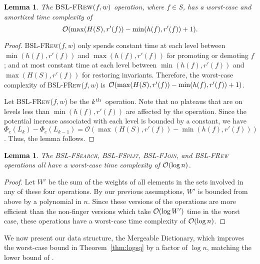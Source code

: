 \documentclass[11pt]{article}
\newcommand{\ens}[1]{\ensuremath{#1}}
\newcommand{\kth}{\ens{k^{ \mbox{\hspace{.2mm}\scriptsize th}}}}
\newcommand{\Ds}{Mergeable Dictionary}
\newcommand{\Bslfsrc}{\mbox{\textsc{BSL-FSearch}}}
\newcommand{\Bslfspl}{\mbox{\textsc{BSL-FSplit}}}
\newcommand{\Bslfjoin}{\mbox{\textsc{BSL-FJoin}}}
\newcommand{\Bslfrew}{\mbox{\textsc{BSL-FRew}}}
\newcommand{\Bslfrewx}[2]{\mbox{\textsc{BSL-FRew(\ensuremath{#1,#2})}}}
\newcommand{\nodeheight}[1]{\ensuremath{h(#1)}}
\newcommand{\intheight}[1]{\ensuremath{H(#1)}}
\newcommand{\nodenewrank}[1]{\ensuremath{r'(\node #1)}}
\newcommand{\node}[1]{\ensuremath{#1}}
\newcommand{\indatast}[1]{\ensuremath{L_{#1}}}
\newcommand{\locpotfun}[1]{\ensuremath{\Phi_{e}(#1)}}
\newcounter{count}
\newtheorem{lemma}[count]{Lemma}
\begin{document}
\begin{lemma} 
\label{lem:costofbslfreweight} 
The $\Bslfrewx{f}{w}$ operation, where $f\in S$, has a worst-case and amortized time complexity of 
\[{\cal O}(\max(\intheight{S},\nodenewrank f) - \min(\nodeheight f, \nodenewrank f)+1).\] 
\end{lemma} 


\begin{proof} 
\Bslfrewx{f}{w} only spends constant time at each level between $\min(\nodeheight f, \nodenewrank f)$ and $\max(\nodeheight f, \nodenewrank f)$ for promoting or demoting \node f; and at most constant time at each level between $\min(\nodeheight f, \nodenewrank f)$ and $\max(\intheight{S},\nodenewrank f)$ for restoring invariants. Therefore, the worst-case complexity of \Bslfrewx{f}{w} is ${\cal O}(\max(\intheight{S},\nodenewrank f) - \min(\nodeheight f, \nodenewrank f)+1)$. 

Let \Bslfrewx{f}{w} be the \kth\ operation. Note that no plateaus that are on levels less than $\min(\nodeheight f, \nodenewrank f)$ are affected by the operation. Since the potential increase associated with each level is bounded by a constant, we have $\locpotfun{\indatast{k}} - \locpotfun{\indatast{k-1}} = \mathcal O(\max(\intheight{S},\nodenewrank f) - \min(\nodeheight f, \nodenewrank f))$. Thus, the lemma follows. 
\end{proof} 


\begin{lemma} 
\label{lem:logncostofextended} 
The \Bslfsrc{}, \Bslfspl{}, \Bslfjoin{}, and \Bslfrew{} operations all have a worst-case time complexity of ${\cal O}(\log n)$. 
\end{lemma} 


\begin{proof} 
Let $W'$ be the sum of the weights of all elements in the sets involved in any of these four operations. By our previous assumptions, $W'$ is bounded from above by a polynomial in $n$. Since these versions of the operations are more efficient than the non-finger versions which take ${\cal O}(\log W')$ time in the worst case, these operations have a worst-case time complexity of  ${\cal O}(\log n)$. 
\end{proof} 





We now present our data structure, the \Ds{}, which improves the worst-case bound in Theorem~\ref{thm:logsq} by a factor of $\log n$, matching the lower bound of \cite{conf/stoc/PatrascuD04}. 
\end{document}
